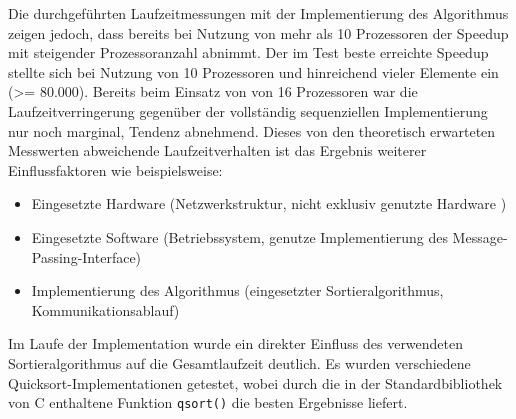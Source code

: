 \documentclass[a4paper,12pt]{scrartcl}
\begin{document}
Die durchgeführten Laufzeitmessungen mit der Implementierung des Algorithmus zeigen jedoch, dass bereits bei Nutzung von mehr als 10 Prozessoren der Speedup mit
steigender
Prozessoranzahl abnimmt. Der im Test beste erreichte Speedup stellte sich bei Nutzung von 10 Prozessoren und hinreichend vieler Elemente ein (>= 80.000).
Bereits beim Einsatz von von 16 Prozessoren war die Laufzeitverringerung gegenüber der vollständig sequenziellen Implementierung nur noch marginal, Tendenz
abnehmend. Dieses von den theoretisch erwarteten Messwerten abweichende Laufzeitverhalten ist das Ergebnis weiterer Einflussfaktoren wie beispielsweise:
\begin{itemize}
  \item Eingesetzte Hardware (Netzwerkstruktur, nicht exklusiv genutzte Hardware )
  \item Eingesetzte Software (Betriebssystem, genutze Implementierung des Message-Passing-Interface)
  \item Implementierung des Algorithmus (eingesetzter Sortieralgorithmus, Kommunikationsablauf)
\end{itemize}
Im Laufe der Implementation wurde ein direkter Einfluss des verwendeten Sortieralgorithmus auf die Gesamtlaufzeit deutlich. Es wurden  verschiedene
Quicksort-Implementationen getestet, wobei durch die in der Standardbibliothek von C enthaltene Funktion \texttt{qsort()} die besten Ergebnisse liefert.
\end{document}
